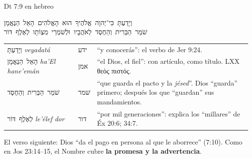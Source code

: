 \documentclass[hyperref={bookmarks=false},aspectratio=169]{beamer}
\newcommand{\heb}[1]{\mbox{\foreignlanguage{hebrew}{#1}}}
\newcommand{\grc}[1]{\foreignlanguage{ancientgreek}{#1}}
\newcommand{\destacar}[1]{\textbf{\textcolor{azul}{#1}}}
\begin{document}
\begin{frame}{Dt 7:9 en hebreo}
\begin{center}
\heb{וְיָדַעְתָּ כִּי־יְהוָה אֱלֹהֶיךָ הוּא הָאֱלֹהִים הָאֵל הַנֶּאֱמָן}\\[2pt]
\heb{שֹׁמֵר הַבְּרִית וְהַחֶסֶד לְאֹהֲבָיו וּלְשֹׁמְרֵי מִצְוֹתָו לְאֶלֶף דּוֹר}
\end{center}
\renewcommand{\arraystretch}{1.12}\scriptsize
\begin{tabular}{@{}>{\RaggedRight\arraybackslash}p{3.0cm}>{\RaggedRight\arraybackslash}p{1.2cm}>{\RaggedRight\arraybackslash}p{7.6cm}@{}}
\toprule
\heb{וְיָדַעְתָּ} \emph{veyadatá} & \heb{ידע} & ``y conocerás'': el verbo de Jer 9:24. \\
\heb{הָאֵל הַנֶּאֱמָן} \emph{ha'El hane'emán} & \heb{אמן} & ``el Dios, el fiel'': con artículo, como título. LXX \grc{θεὸς πιστός}. \\
\heb{שֹׁמֵר הַבְּרִית וְהַחֶסֶד} & \heb{שׁמר} & ``que guarda el pacto y la \emph{jésed}''. Dios ``guarda'' primero; después los que ``guardan'' sus mandamientos. \\
\heb{לְאֶלֶף דּוֹר} \emph{le'élef dor} & \heb{דור} & ``por mil generaciones'': explica los ``millares'' de Éx 20:6; 34:7. \\
\bottomrule
\end{tabular}\par\smallskip
\small El verso siguiente: Dios ``da el pago en persona al que le aborrece'' (7:10). Como en Jos 23:14--15, el Nombre cubre \destacar{la promesa y la advertencia}.
\end{frame}
\end{document}

